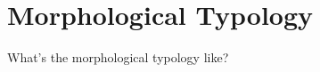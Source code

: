 \chapter{Morphological Typology}
\label{cha:tvk-morphological-typology}

What's the morphological typology like?